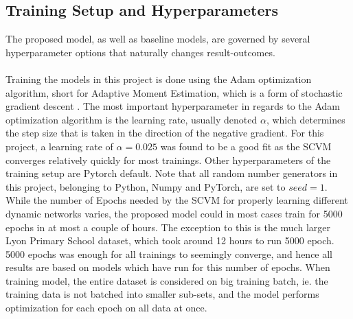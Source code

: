 \subsection{Training Setup and Hyperparameters}
\label{sec:Method:Reproducibility:TrainingSetup}
The proposed model, as well as baseline models, are governed by several hyperparameter options that naturally changes result-outcomes. 
\\\\
Training the models in this project is done using the Adam optimization algorithm, short for Adaptive Moment Estimation, which is a form of stochastic gradient descent \cite{Kingma2014Adam:Optimization}.
The most important hyperparameter in regards to the Adam optimization algorithm is the learning rate, usually denoted $\alpha$, which determines the step size that is taken in the direction of the negative gradient. 
For this project, a learning rate of $\alpha = 0.025$ was found to be a good fit as the SCVM converges relatively quickly for most trainings.
Other hyperparameters of the training setup are Pytorch default.
Note that all random number generators in this project, belonging to Python, Numpy and PyTorch, are set to $seed = 1$.
\\
While the number of Epochs needed by the SCVM for properly learning different dynamic networks varies, the proposed model could in most cases train for 5000 epochs in at most a couple of hours.
The exception to this is the much larger Lyon Primary School dataset, which took around 12 hours to run 5000 epoch.
5000 epochs was enough for all trainings to seemingly converge, and hence all results are based on models which have run for this number of epochs.
When training model, the entire dataset is considered on big training batch, ie. the training data is not batched into smaller sub-sets, and the model performs optimization for each epoch on all data at once.

